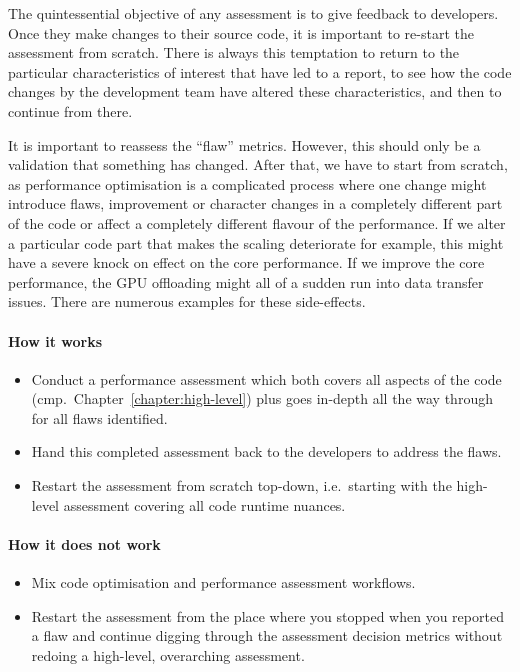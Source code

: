 The quintessential objective of any assessment is to give feedback to developers.
Once they make changes to their source code, it is important to re-start the 
assessment from scratch.
There is always this temptation to return to the particular characteristics of interest that have led to a report, to see how the code changes by the development team have altered these characteristics, and then to continue from there.


It is important to reassess the ``flaw'' metrics.
However, this should only be a validation that something has changed.
After that, we have to start from scratch, as performance optimisation is a complicated process where one change might introduce flaws, improvement or character changes in a completely different part of the code or affect a completely different flavour of the performance.
If we alter a particular code part that makes the scaling deteriorate for example, this might have a severe knock on effect on the core performance.
If we improve the core performance, the GPU offloading might all of a sudden run into data transfer issues.
There are numerous examples for these side-effects.


\paragraph*{How it works}

\begin{itemize}[noitemsep]
  \item[$\boxplus$] Conduct a performance assessment which both covers all aspects of the code (cmp.~Chapter~\ref{chapter:high-level}) plus goes in-depth all the way through for all flaws identified.
  \item[$\boxplus$] Hand this completed assessment back to the developers to address the flaws.
  \item[$\boxplus$] Restart the assessment from scratch top-down, i.e.~starting with the high-level assessment covering all code runtime nuances.
\end{itemize}


\paragraph*{How it does not work}

\begin{itemize}[noitemsep]
  \item[$\boxminus$] Mix code optimisation and performance assessment workflows.
  \item[$\boxminus$] Restart the assessment from the place where you stopped when you reported a flaw and continue digging through the assessment decision metrics without redoing a high-level, overarching assessment.
\end{itemize}
